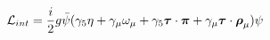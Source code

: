 \begin{equation}
{\cal L}_{int} = \frac{i}{2} g \bar{\psi} ( \gamma_{5} \eta +\gamma_{\mu} 
\omega_{\mu} + \gamma_{5} \mbox{\boldmath $\tau$} \cdot \mbox{\boldmath $\pi$} + \gamma_{\mu}
\mbox{\boldmath $\tau$} \cdot \mbox{\boldmath $\rho$}_{\mu}) \psi 
\end{equation}

